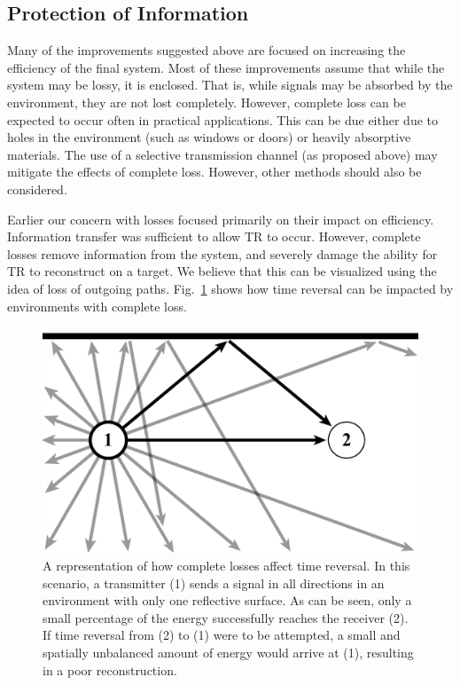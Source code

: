 \subsection{Protection of Information}

Many of the improvements suggested above are focused on increasing the efficiency of the final system. Most of these improvements assume that while the system may be lossy, it is enclosed. That is, while signals may be absorbed by the environment, they are not lost completely. However, complete loss can be expected to occur often in practical applications. This can be due either due to holes in the environment (such as windows or doors) or heavily absorptive materials. The use of a selective transmission channel (as proposed above) may mitigate the effects of complete loss.  However, other methods should also be considered.

Earlier our concern with losses focused primarily on their impact on efficiency. Information transfer was sufficient to allow TR to occur. However, complete losses remove information from the system, and severely damage the ability for TR to reconstruct on a target. We believe that this can be visualized using the idea of loss of outgoing paths. Fig.~\ref{fig:outgoing} shows how time reversal can be impacted by environments with complete loss.

\begin{figure}[t]
\includegraphics[width=\columnwidth]{figs/future/outgoing}
\caption[Example of information loss on time reversal efficacy]{A representation of how complete losses affect time reversal. In this scenario, a transmitter (1) sends a signal in all directions in an environment with only one reflective surface. As can be seen, only a small percentage of the energy successfully reaches the receiver (2). If time reversal from (2) to (1) were to be attempted, a small and spatially unbalanced amount of energy would arrive at (1), resulting in a poor reconstruction.}
\label{fig:outgoing}
\end{figure}


